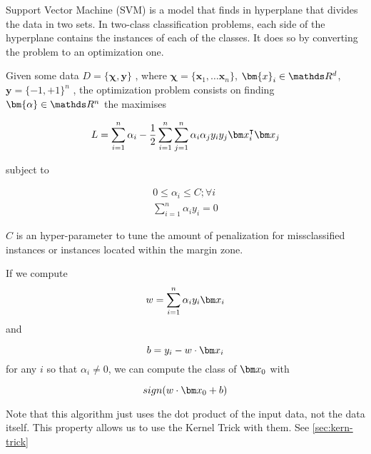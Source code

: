   \begin{pre-delivery}
    Support Vector Machine\cite{Cortes1995} (SVM) is a model that finds in hyperplane that
    divides the data in two sets. In two-class classification problems, each
    side of the hyperplane contains the instances of each of the classes.
    It does so by converting the problem to an optimization one.

    Given some data
    $D = \{\bm{\chi}, \bm{y}\}$
    , where
    $\bm{\chi} = \{\bm{x}_1, \ldots \bm{x}_n\}$, $\bm{x}_i \in \reals^d$, $\bm{y} = \{-1, +1\}^n$
    , the optimization problem consists on finding $\bm{\alpha} \in \reals^n$
    the maximises

\begin{equation}
  L = \sum_{i = 1}^n\alpha_i -\frac{1}{2}\sum_{i = 1}^n\sum_{j = 1}^n\alpha_i\alpha_jy_iy_j\vx_i^\transp\vx_j
\end{equation}

subject to

\begin{align}
  0 \leq \alpha_i \leq C; \forall i\\
  \sum_{i = 1}^n \alpha_iy_i = 0
\end{align}


$C$ is an hyper-parameter to tune the amount of penalization for missclassified
instances or instances located within the margin zone.

If we compute
\begin{equation}
  w = \sum_{i = 1}^n\alpha_iy_i\vx_i
\end{equation}
and

\begin{equation}
  b = y_i - w\cdot\vx_i
\end{equation}
for any $i$ so that $\alpha_i \neq 0$, we can compute the class of $\vx_0$ with

\begin{equation}
sign(w\cdot\vx_0 + b)
\end{equation}

Note that this algorithm just uses the dot product of the input data, not the
data itself. This property allows us to use the Kernel Trick with them.
See \ref{sec:kern-trick}

\end{pre-delivery}


